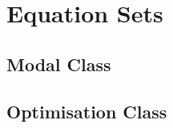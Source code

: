 \clearemptydoublepage
\chapter{Equation Sets}
\label{cha:equationsets}

\section{Modal Class}
\clearpage

\section{Optimisation Class}
\clearpage

